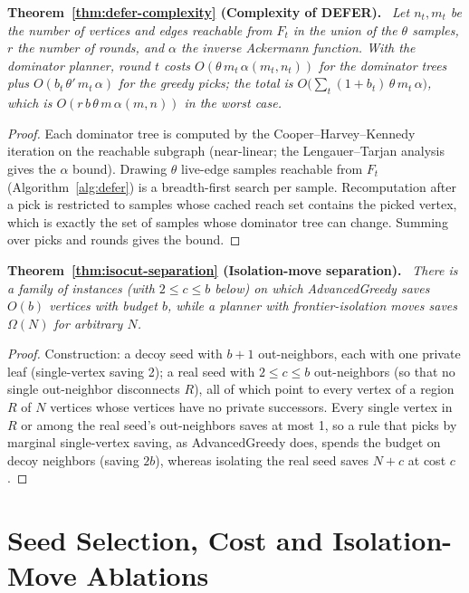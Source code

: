 \documentclass[11pt]{article}
\theoremstyle{definition}
\theoremstyle{remark}
\newenvironment{repeattheorem}[1][]{\par\medskip\noindent\textbf{#1.}\ \itshape}{\par\medskip}
\begin{document}
\begin{repeattheorem}[Theorem~\ref{thm:defer-complexity} (Complexity of DEFER)]
Let $n_t,m_t$ be the number of vertices and edges reachable from $F_t$ in
the union of the $\theta$ samples, $r$ the number of rounds, and $\alpha$
the inverse Ackermann function. With the dominator planner, round $t$
costs $O(\theta\,m_t\,\alpha(m_t,n_t))$ for the dominator trees plus
$O(b_t\,\theta'\,m_t\,\alpha)$ for the greedy picks; the total is
$O\bigl(\sum_t(1+b_t)\,\theta\,m_t\,\alpha\bigr)$, which is
$O(r\,b\,\theta\,m\,\alpha(m,n))$ in the worst case.
\end{repeattheorem}
\begin{proof}
Each dominator tree is computed by the Cooper--Harvey--Kennedy iteration
on the reachable subgraph (near-linear; the Lengauer--Tarjan analysis gives
the $\alpha$ bound). Drawing $\theta$ live-edge samples reachable from
$F_t$ (Algorithm~\ref{alg:defer}) is a breadth-first search per sample. Recomputation after a pick is restricted to samples
whose cached reach set contains the picked vertex, which is exactly the
set of samples whose dominator tree can change. Summing over picks and
rounds gives the bound.
\end{proof}

\begin{repeattheorem}[Theorem~\ref{thm:isocut-separation} (Isolation-move separation)]
There is a family of instances (with $2\le c\le b$ below) on which AdvancedGreedy saves $O(b)$ vertices with budget $b$,
while a planner with frontier-isolation moves saves $\Omega(N)$ for
arbitrary $N$.
\end{repeattheorem}
\begin{proof}
Construction: a decoy seed with $b+1$ out-neighbors, each with one private
leaf (single-vertex saving 2); a real seed with $2\le c\le b$ out-neighbors (so that no single out-neighbor disconnects $R$), all
of which point to every vertex of a region $R$ of $N$ vertices whose
vertices have no private successors. Every single vertex in $R$ or among
the real seed's out-neighbors saves at most 1, so a rule that picks by marginal single-vertex saving, as AdvancedGreedy does,
spends the budget on decoy neighbors (saving $2b$), whereas
isolating the real seed saves $N+c$ at cost $c$.
\end{proof}

\section{Seed Selection, Cost and Isolation-Move Ablations}\label{ec:seed-sensitivity}
\end{document}
